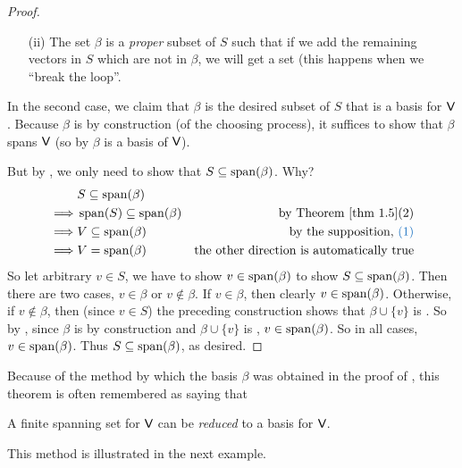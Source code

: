 \begin{proof}
\begin{enumerate}
\item [(ii)] The set \(\beta\) is a \emph{proper} \LID{} subset of \(S\) such that if we add the remaining vectors in \(S\) which are not in \(\beta\), we will get a \LDP{} set (this happens when we ``break the loop''.
\end{enumerate}
In the second case, we claim that \(\beta\) is the desired subset of \(S\) that is a basis for \(\textsf{V}\).
Because \(\beta\) is \LID{} by construction (of the choosing process), it suffices to show that \(\beta\) spans \(\textsf{V}\) (so by  \(\beta\) is a basis of \(\textsf{V}\)).

But by , we only need to show that \(S \subseteq \operatorname{span}(\beta)\).
Why?
\begin{align*}
             & S \subseteq \spann(\beta) \\
    \implies & \spann(S) \subseteq \spann(\beta) & \text{by \THM{1.5}}(2) \\
    \implies & V \subseteq \spann(\beta) & \text{by the supposition, \BLUE{(1)}} \\
    \implies & V = \spann(\beta) & \text{the other direction is automatically true}
\end{align*}
So let arbitrary \(v \in S\), we have to show \(v \in \operatorname{span}(\beta)\) to show \(S \subseteq \operatorname{span}(\beta)\).
Then there are two cases, \(v \in \beta\) or \(v \notin \beta\).
If \(v \in \beta\), then clearly \(v \in \operatorname{span}(\beta)\).
Otherwise, if \(v \notin \beta\), then (since \(v \in S\)) the preceding construction shows that \(\beta \cup \{ v \}\) is \LDP{}.
So by , since \(\beta\) is \LID{} by construction and \(\beta \cup \{ v \}\) is \LDP{}, \(v \in \operatorname{span}(\beta)\).
So in all cases, \(v \in \operatorname{span}(\beta)\).
Thus \(S \subseteq \operatorname{span}(\beta)\), as desired.
\end{proof}

\begin{remark} \label{remark 1.6.2}
Because of the method by which the basis \(\beta\) was obtained in the proof of , this theorem is often remembered as saying that
\begin{center}
    A finite spanning set for \(\textsf{V}\) can be \emph{reduced} to a basis for \(\textsf{V}\).
\end{center}
This method is illustrated in the next example.
\end{remark}

